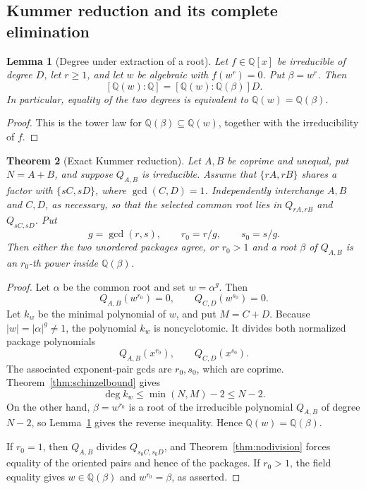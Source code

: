 \documentclass[11pt]{article}
\numberwithin{equation}{section}
\newtheorem{theorem}{Theorem}[section]
\newtheorem{lemma}[theorem]{Lemma}
\theoremstyle{definition}
\newcommand{\Q}{\mathbb Q}
\begin{document}
\subsection{Kummer reduction and its complete elimination}

\begin{lemma}[Degree under extraction of a root]
\label{lem:kummerdegree}
Let \(f\in\Q[x]\) be irreducible of degree \(D\), let \(r\geq1\), and let
\(w\) be algebraic with \(f(w^r)=0\).  Put \(\beta=w^r\).  Then
\[
 [\Q(w):\Q]=[\Q(w):\Q(\beta)]D.
\]
In particular, equality of the two degrees is equivalent to
\(\Q(w)=\Q(\beta)\).
\end{lemma}

\begin{proof}
This is the tower law for \(\Q(\beta)\subseteq\Q(w)\), together with the
irreducibility of \(f\).
\end{proof}

\begin{theorem}[Exact Kummer reduction]
\label{thm:kummerreduction}
Let \(A,B\) be coprime and unequal, put \(N=A+B\), and suppose
\(Q_{A,B}\) is irreducible.  Assume that \(\{rA,rB\}\) shares a factor
with \(\{sC,sD\}\), where \(\gcd(C,D)=1\).  Independently interchange \(A,B\) and \(C,D\), as necessary, so that the
selected common root lies in \(Q_{rA,rB}\) and \(Q_{sC,sD}\).  Put
\[
 g=\gcd(r,s),\qquad r_0=r/g,\qquad s_0=s/g.
\]
Then either the two unordered packages agree, or \(r_0>1\) and a root
\(\beta\) of \(Q_{A,B}\) is an \(r_0\)-th power inside \(\Q(\beta)\).
\end{theorem}

\begin{proof}
Let \(\alpha\) be the common root and set \(w=\alpha^g\).  Then
\[
 Q_{A,B}(w^{r_0})=0,
 \qquad Q_{C,D}(w^{s_0})=0.
\]
Let \(k_w\) be the minimal polynomial of \(w\), and put \(M=C+D\).
Because \(|w|=|\alpha|^g\neq1\), the polynomial \(k_w\) is noncyclotomic.
It divides both normalized package polynomials
\[
 Q_{A,B}(x^{r_0}),
 \qquad Q_{C,D}(x^{s_0}).
\]
The associated exponent-pair gcds are \(r_0,s_0\), which are coprime.
Theorem~\ref{thm:schinzelbound} gives
\[
 \deg k_w\leq\min(N,M)-2\leq N-2.
\]
On the other hand, \(\beta=w^{r_0}\) is a root of the irreducible polynomial
\(Q_{A,B}\) of degree \(N-2\), so Lemma~\ref{lem:kummerdegree} gives the
reverse inequality.  Hence \(\Q(w)=\Q(\beta)\).

If \(r_0=1\), then \(Q_{A,B}\) divides \(Q_{s_0C,s_0D}\), and
Theorem~\ref{thm:nodivision} forces equality of the oriented pairs and hence
of the packages.  If \(r_0>1\), the field equality gives
\(w\in\Q(\beta)\) and \(w^{r_0}=\beta\), as asserted.
\end{proof}
\end{document}
